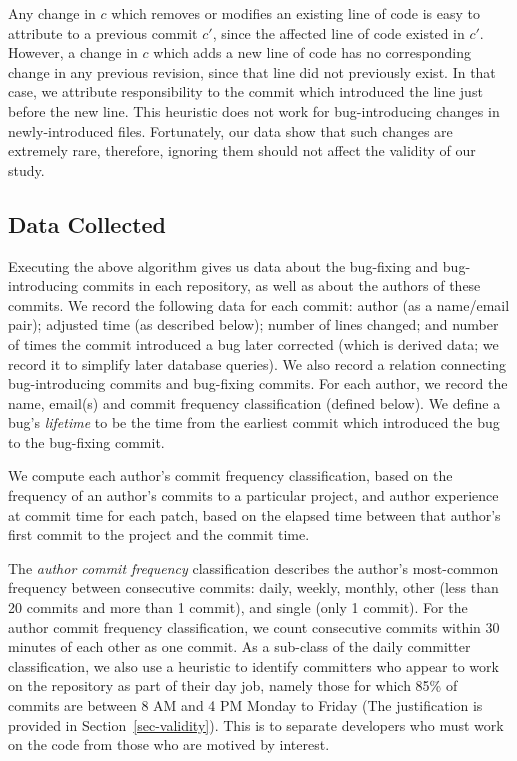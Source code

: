 Any change in $c$ which removes or modifies an existing line of code is easy to
attribute to a previous commit $c'$, since the affected line of code existed in
$c'$. However, a change in $c$ which adds a new line of code has no
corresponding change in any previous revision, since that line did not
previously exist. In that case, we attribute responsibility to the commit which
introduced the line just before the new line. This heuristic does not work for
bug-introducing changes in newly-introduced files. Fortunately, our data show
that such changes are extremely rare, therefore, ignoring them should not affect the validity of our study. 

\subsection{Data Collected}
\label{sec:data}

Executing the above algorithm gives us data about the bug-fixing and
bug-introducing commits in each repository, as well as about the authors of
these commits. We record the following data for each commit: author (as a
name/email pair); adjusted time (as described below); number of lines changed;
and number of times the commit introduced a bug later corrected (which is
derived data; we record it to simplify later database queries). We also record a
relation connecting bug-introducing commits and bug-fixing commits. For each
author, we record the name, email(s) and 
commit frequency classification (defined below). We define a
bug's {\em lifetime} to be the time from the earliest commit which introduced 
the bug to the bug-fixing commit.

We compute each author's commit frequency classification, based on the frequency of an
author's commits to a particular project, and author experience at commit time
for each patch, based on the elapsed time between that author's first commit to
the project and the commit time.

The {\em author commit frequency} classification describes the author's most-common
frequency between consecutive commits: daily, weekly, monthly, other (less than
20 commits and more than 1 commit), and single (only 1 commit). For the author commit frequency classification,
we count consecutive commits within 30 minutes of each other as one commit. As a
sub-class of the daily committer classification, we also use a heuristic to
identify committers who appear to work on the repository as part of their day
job, namely those for which 85\% of commits are between 8 AM and 4 PM Monday to
Friday (The justification is provided in Section~\ref{sec-validity}). This is to separate developers who must work on the code from those who
are motived by interest.

